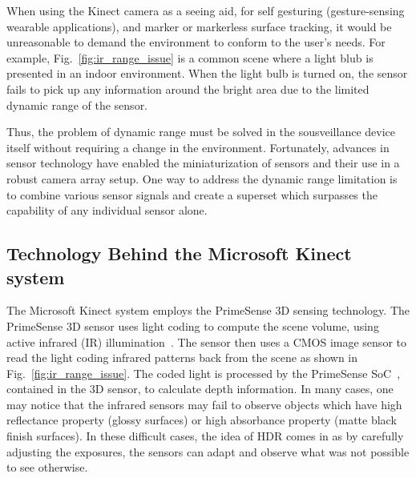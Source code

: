 When using the Kinect camera as a seeing aid, for self gesturing (gesture-sensing wearable 
applications), and marker or markerless surface tracking, it would be unreasonable to demand the 
environment to conform to the user's needs. For example, Fig.~\ref{fig:ir_range_issue} is a 
common scene where a light blub is presented in an indoor environment. When the light bulb is 
turned on, the sensor fails to pick up any information around the bright area due to the limited 
dynamic range of the sensor. 

Thus, the problem of dynamic range must be solved in the sousveillance device itself without 
requiring a  change in the environment. Fortunately, advances in sensor technology have enabled 
the miniaturization of sensors and their use in a robust camera array setup. One way to address 
the dynamic range limitation is to combine various sensor signals and create a superset which 
surpasses the capability of any individual sensor alone.

\subsection{Technology Behind the Microsoft Kinect system}
The Microsoft Kinect system employs the PrimeSense 3D sensing technology. The PrimeSense 3D 
sensor uses light coding to compute the scene volume, using active infrared (IR) 
illumination~\cite{shpunt2008depth,shpunt2010optical,shpunt2007depth}. The sensor then uses a 
CMOS image sensor to read the light coding infrared patterns back from the scene as shown in 
Fig.~\ref{fig:ir_range_issue}. The coded light is processed by the PrimeSense 
SoC~\cite{spektor2009integrated}, contained in the 3D sensor, to calculate depth information. In 
many cases, one may notice that the infrared sensors may fail to observe objects which have high 
reflectance property (glossy surfaces) or high absorbance property (matte black finish surfaces). In 
these difficult cases, the idea of HDR comes in as by carefully adjusting the exposures, the 
sensors can adapt and observe what was not possible to see otherwise.

